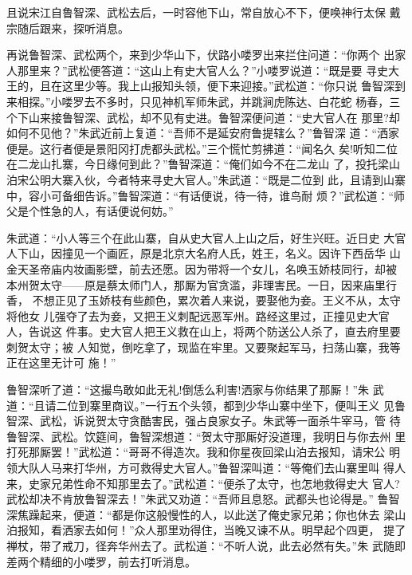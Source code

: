 且说宋江自鲁智深、武松去后，一时容他下山，常自放心不下，便唤神行太保
戴宗随后跟来，探听消息。

再说鲁智深、武松两个，来到少华山下，伏路小喽罗出来拦住问道：“你两个
出家人那里来？”武松便答道：“这山上有史大官人么？”小喽罗说道：“既是要
寻史大王的，且在这里少等。我上山报知头领，便下来迎接。”武松道：“你只说
鲁智深到来相探。”小喽罗去不多时，只见神机军师朱武，并跳涧虎陈达、白花蛇
杨春，三个下山来接鲁智深、武松，却不见有史进。鲁智深便问道：“史大官人在
那里?却如何不见他？”朱武近前上复道：“吾师不是延安府鲁提辖么？”鲁智深
道：“洒家便是。这行者便是景阳冈打虎都头武松。”三个慌忙剪拂道：“闻名久
矣!听知二位在二龙山扎寨，今日缘何到此？”鲁智深道：“俺们如今不在二龙山
了，投托梁山泊宋公明大寨入伙，今者特来寻史大官人。”朱武道：“既是二位到
此，且请到山寨中，容小可备细告诉。”鲁智深道：“有话便说，待一待，谁鸟耐
烦？”武松道：“师父是个性急的人，有话便说何妨。”

朱武道：“小人等三个在此山寨，自从史大官人上山之后，好生兴旺。近日史
大官人下山，因撞见一个画匠，原是北京大名府人氏，姓王，名义。因许下西岳华
山金天圣帝庙内妆画影壁，前去还愿。因为带将一个女儿，名唤玉娇枝同行，却被
本州贺太守——原是蔡太师门人，那厮为官贪滥，非理害民。一日，因来庙里行香，
不想正见了玉娇枝有些颜色，累次着人来说，要娶他为妾。王义不从，太守将他女
儿强夺了去为妾，又把王义刺配远恶军州。路经这里过，正撞见史大官人，告说这
件事。史大官人把王义救在山上，将两个防送公人杀了，直去府里要刺贺太守；被
人知觉，倒吃拿了，现监在牢里。又要聚起军马，扫荡山寨，我等正在这里无计可
施！”

鲁智深听了道：“这撮鸟敢如此无礼!倒恁么利害!洒家与你结果了那厮！”朱
武道：“且请二位到寨里商议。”一行五个头领，都到少华山寨中坐下，便叫王义
见鲁智深、武松，诉说贺太守贪酷害民，强占良家女子。朱武等一面杀牛宰马，管
待鲁智深、武松。饮筵间，鲁智深想道：“贺太守那厮好没道理，我明日与你去州
里打死那厮罢！”武松道：“哥哥不得造次。我和你星夜回梁山泊去报知，请宋公
明领大队人马来打华州，方可救得史大官人。”鲁智深叫道：“等俺们去山寨里叫
得人来，史家兄弟性命不知那里去了。”武松道：“便杀了太守，也怎地救得史大
官人?武松却决不肯放鲁智深去！”朱武又劝道：“吾师且息怒。武都头也论得是。”
鲁智深焦躁起来，便道：“都是你这般慢性的人，以此送了俺史家兄弟；你也休去
梁山泊报知，看洒家去如何！”众人那里劝得住，当晚又谏不从。明早起个四更，
提了禅杖，带了戒刀，径奔华州去了。武松道：“不听人说，此去必然有失。”朱
武随即差两个精细的小喽罗，前去打听消息。

